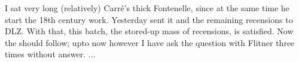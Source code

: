 I sat very long (relatively) Carré's thick Fontenelle, since at the same time he  start the 18th century work. Yesterday sent it and the remaining recensions to DLZ. With that, this batch, the stored-up mass of recensions, is satisfied. Now the  should follow; upto now however I have ask the question with Flitner three times without answer.
...